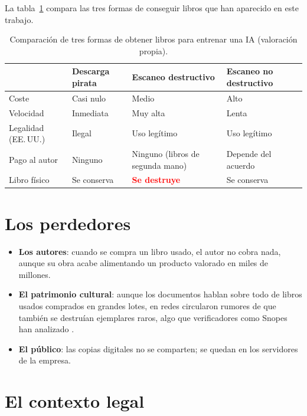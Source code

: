 \documentclass[11pt,a4paper,twoside,openright]{book}
\begin{document}
La tabla~\ref{tab:comparacion} compara las tres formas de conseguir libros que han
aparecido en este trabajo.

\begin{table}[htbp]
  \centering
  \caption[Comparación de formas de obtener libros]{Comparación de tres formas de
    obtener libros para entrenar una IA (valoración propia).}
  \label{tab:comparacion}
  \begin{tabularx}{\textwidth}{@{}lXXX@{}}
    \toprule
    & \textbf{Descarga pirata} & \textbf{Escaneo destructivo} & \textbf{Escaneo no destructivo} \\
    \midrule
    Coste           & Casi nulo        & Medio            & Alto \\
    Velocidad       & Inmediata        & Muy alta         & Lenta \\
    Legalidad (EE.\,UU.) & Ilegal      & Uso legítimo     & Uso legítimo \\
    Pago al autor   & Ninguno          & Ninguno (libros de segunda mano) & Depende del acuerdo \\
    Libro físico    & Se conserva      & \textcolor{red}{\textbf{Se destruye}} & Se conserva \\
    \bottomrule
  \end{tabularx}
\end{table}

\section{Los perdedores}

\begin{itemize}
  \item \textbf{Los autores}: cuando se compra un libro usado, el autor no cobra
        nada, aunque su obra acabe alimentando un producto valorado en miles de
        millones.
  \item \textbf{El patrimonio cultural}: aunque los documentos hablan sobre todo de
        libros usados comprados en grandes lotes, en redes circularon rumores de
        que también se destruían ejemplares raros, algo que verificadores como
        Snopes han analizado \cite{snopes2026}.
  \item \textbf{El público}: las copias digitales no se comparten; se quedan en los
        servidores de la empresa.
\end{itemize}

\section{El contexto legal}
\end{document}
